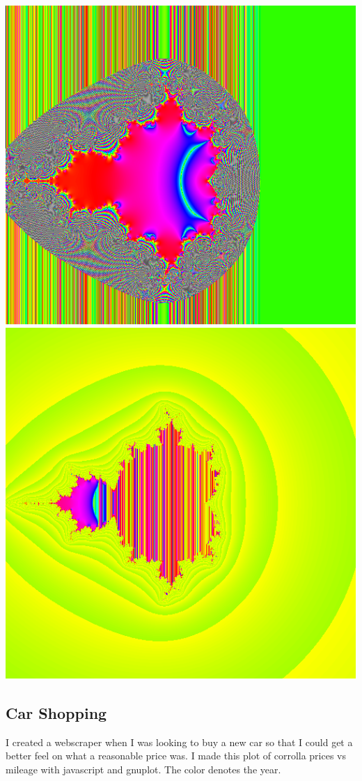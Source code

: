 \documentclass[../resume.tex]{subfiles}
\begin{document}
\includegraphics[scale=0.15]{../TAing/mandel/ummmm.png}
\includegraphics[scale=0.15]{../TAing/mandel/What.png}

\newpage
\subsection{Car Shopping}
I created a webscraper when I was looking to buy a new car so that I could get a better feel on what a reasonable price was.  I made this plot of corrolla prices vs mileage with javascript and gnuplot.  The color denotes the year.
\end{document}
